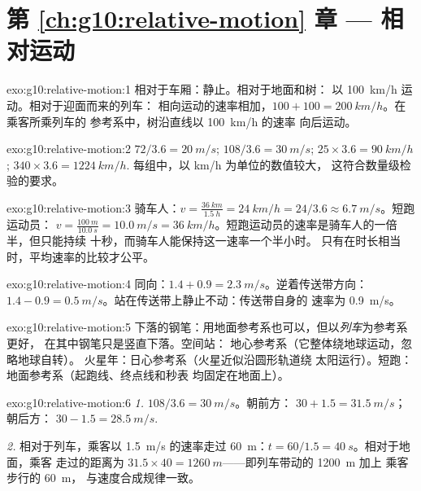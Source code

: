 \section*{第 \ref{ch:g10:relative-motion} 章 --- 相对运动}

\begin{solution}{exo:g10:relative-motion:1}
相对于车厢：静止。相对于地面和树：
以 \qty{100}{km/h} 运动。相对于迎面而来的列车：
相向运动的速率相加，$100 + 100 = \qty{200}{km/h}$。在乘客所乘列车的
参考系中，树沿直线以 \qty{100}{km/h} 的速率
向后运动。
\end{solution}

\begin{solution}{exo:g10:relative-motion:2}
$72 / 3.6 = \qty{20}{m/s}$; $108 / 3.6 = \qty{30}{m/s}$;
$25 \times 3.6 = \qty{90}{km/h}$; $340 \times 3.6 = \qty{1224}{km/h}$.
每组中，以 \unit{km/h} 为单位的数值较大，
这符合数量级检验的要求。
\end{solution}

\begin{solution}{exo:g10:relative-motion:3}
骑车人：$v = \frac{\qty{36}{km}}{\qty{1.5}{h}} = \qty{24}{km/h}
= 24/3.6 \approx \qty{6.7}{m/s}$。短跑运动员：
$v = \frac{\qty{100}{m}}{\qty{10.0}{s}} = \qty{10.0}{m/s}
= \qty{36}{km/h}$。短跑运动员的速率是骑车人的一倍半，但只能持续
十秒，而骑车人能保持这一速率一个半小时。
只有在时长相当时，平均速率的比较才公平。
\end{solution}

\begin{solution}{exo:g10:relative-motion:4}
同向：$1.4 + 0.9 = \qty{2.3}{m/s}$。逆着传送带方向：
$1.4 - 0.9 = \qty{0.5}{m/s}$。站在传送带上静止不动：传送带自身的
速率为 \qty{0.9}{m/s}。
\end{solution}

\begin{solution}{exo:g10:relative-motion:5}
下落的钢笔：用地面参考系也可以，但以\emph{列车}为参考系更好，
在其中钢笔只是竖直下落。空间站：
地心参考系（它整体绕地球运动，忽略地球自转）。
火星年：日心参考系（火星近似沿圆形轨道绕
太阳运行）。短跑：地面参考系（起跑线、终点线和秒表
均固定在地面上）。
\end{solution}

\begin{solution}{exo:g10:relative-motion:6}
\emph{1.} $108/3.6 = \qty{30}{m/s}$。朝前方：
$30 + 1.5 = \qty{31.5}{m/s}$；朝后方：
$30 - 1.5 = \qty{28.5}{m/s}$.

\emph{2.} 相对于列车，乘客以
\qty{1.5}{m/s} 的速率走过 \qty{60}{m}：$t = 60/1.5 = \qty{40}{s}$。相对于地面，乘客
走过的距离为 $31.5 \times 40 = \qty{1260}{m}$——即列车带动的 \qty{1200}{m} 加上
乘客步行的 \qty{60}{m}，
与速度合成规律一致。
\end{solution}

